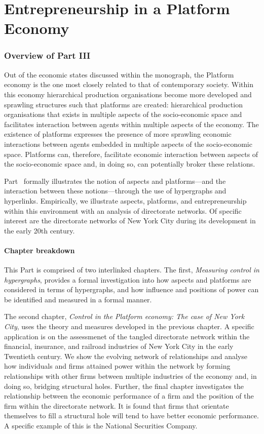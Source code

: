 \part{Entrepreneurship in a Platform Economy} 
\label{part:entrepreneurshipPlatformEconomy}

\section*{Overview of Part III}

Out of the economic states discussed within the monograph, the Platform economy is the one most closely related to that of contemporary society. Within this economy hierarchical production organisations become more developed and sprawling structures such that platforms are created: hierarchical production organisations that exists in multiple aspects of the socio-economic space and facilitates interaction between agents within multiple aspects of the economy. The existence of platforms expresses the presence of more sprawling economic interactions between agents embedded in multiple aspects of the socio-economic space. Platforms can, therefore, facilitate economic interaction between aspects of the socio-economic space and, in doing so, can potentially broker these relations.

Part~\ref{part:entrepreneurshipPlatformEconomy} formally illustrates the notion of aspects and platforms---and the interaction between these notions---through the use of hypergraphs and hyperlinks. Empirically, we illustrate aspects, platforms, and entrepreneurship within this environment with an analysis of directorate networks. Of specific interest are the directorate networks of New York City during its development in the early 20th century.

\subsection*{Chapter breakdown}

This Part is comprised of two interlinked chapters. The first, \emph{Measuring control in hypergraphs}, provides a formal investigation into how aspects and platforms are considered in terms of hypergraphs, and how influence and positions of power can be identified and measured in a formal manner.

The second chapter, \emph{Control in the Platform economy: The case of New York City}, uses the theory and measures developed in the previous chapter. A specific application is on the assessmenet of the tangled directorate network within the financial, insurance, and railroad industries of New York City in the early Twentieth century. We show the evolving network of relationships and analyse how individuals and firms attained power within the network by forming relationships with other firms between multiple industries of the economy and, in doing so, bridging structural holes. Further, the final chapter investigates the relationship between the economic performance of a firm and the position of the firm within the directorate network. It is found that firms that orientate themselves to fill a structural hole will tend to have better economic performance. A specific example of this is the National Securities Company.